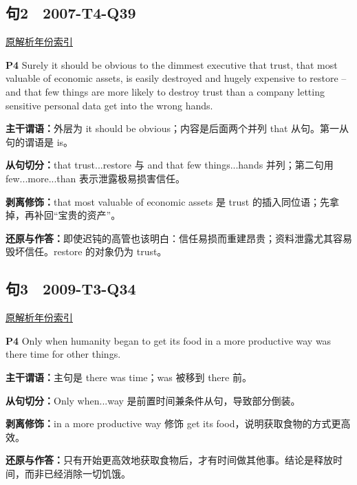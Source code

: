 \documentclass[11pt,a4paper]{article}
\begin{document}
\subsection{句2　2007-T4-Q39}
\noindent \href{https://zj139.github.io/math-notes/english/4583f11cfad63caee815e722/\#q39}{原解析}\quad \hyperref[idx-2007-T4-Q39]{年份索引}
\begin{evidence}\textbf{P4} Surely it should be obvious to the dimmest executive that trust, that most valuable of economic assets, is easily destroyed and hugely expensive to restore – and that few things are more likely to destroy trust than a company letting sensitive personal data get into the wrong hands.\end{evidence}
\noindent\textbf{主干谓语：}外层为 it should be obvious；内容是后面两个并列 that 从句。第一从句的谓语是 is。\par
\noindent\textbf{从句切分：}that trust...restore 与 and that few things...hands 并列；第二句用 few...more...than 表示泄露极易损害信任。\par
\noindent\textbf{剥离修饰：}that most valuable of economic assets 是 trust 的插入同位语；先拿掉，再补回“宝贵的资产”。\par
\noindent\textbf{还原与作答：}即使迟钝的高管也该明白：信任易损而重建昂贵；资料泄露尤其容易毁坏信任。restore 的对象仍为 trust。\par
{}
\subsection{句3　2009-T3-Q34}
\noindent \href{https://zj139.github.io/math-notes/english/218135c1190c9ac029fd9ef3/\#q34}{原解析}\quad \hyperref[idx-2009-T3-Q34]{年份索引}
\begin{evidence}\textbf{P4} Only when humanity began to get its food in a more productive way was there time for other things.\end{evidence}
\noindent\textbf{主干谓语：}主句是 there was time；was 被移到 there 前。\par
\noindent\textbf{从句切分：}Only when...way 是前置时间兼条件从句，导致部分倒装。\par
\noindent\textbf{剥离修饰：}in a more productive way 修饰 get its food，说明获取食物的方式更高效。\par
\noindent\textbf{还原与作答：}只有开始更高效地获取食物后，才有时间做其他事。结论是释放时间，而非已经消除一切饥饿。\par
{}
\end{document}
